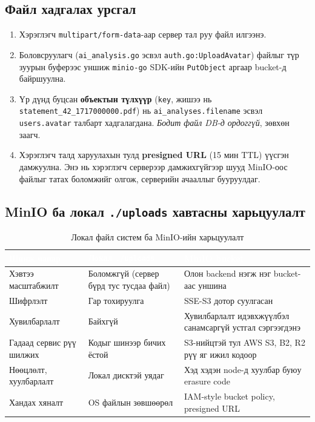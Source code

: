 \subsection{Файл хадгалах урсгал}
\begin{enumerate}
    \item Хэрэглэгч \texttt{multipart/form-data}-аар сервер тал руу файл илгээнэ.
    \item Боловсруулагч (\texttt{ai\_analysis.go} эсвэл \texttt{auth.go:UploadAvatar}) файлыг түр зуурын буферээс уншиж \texttt{minio-go} SDK-ийн \texttt{PutObject} аргаар bucket-д байршуулна.
    \item Үр дүнд буцсан \textbf{объектын түлхүүр} (\texttt{key}, жишээ нь \texttt{statement\_42\_1717000000.pdf}) нь \texttt{ai\_analyses.filename} эсвэл \texttt{users.avatar} талбарт хадгалагдана. \emph{Бодит файл DB-д ордоггүй}, зөвхөн заагч.
    \item Хэрэглэгч талд харуулахын тулд \textbf{presigned URL} (15 мин TTL) үүсгэн дамжуулна. Энэ нь хэрэглэгч серверээр дамжихгүйгээр шууд MinIO-оос файлыг татах боломжийг олгож, серверийн ачааллыг бууруулдаг.
\end{enumerate}

\subsection{MinIO ба локал \texttt{./uploads} хавтасны харьцуулалт}
\begin{table}[ht]
\centering
\footnotesize
\renewcommand{\arraystretch}{1.3}
\begin{tabular}{|p{3.5cm}|p{4.2cm}|p{4.5cm}|}
\hline
\rowcolor{darknavy}
\textcolor{white}{\textbf{Шинж чанар}} & \textcolor{white}{\textbf{Локал \texttt{./uploads}}} & \textcolor{white}{\textbf{MinIO bucket}} \\ \hline
Хэвтээ масштабжилт & Боломжгүй (сервер бүрд тус тусдаа файл) & Олон backend нэгж нэг bucket-аас уншина \\ \hline
Шифрлэлт            & Гар тохируулга                          & SSE-S3 дотор суулгасан \\ \hline
Хувилбарлалт         & Байхгүй                                 & Хувилбарлалт идэвхжүүлбэл санамсаргүй устгал сэргээгдэнэ \\ \hline
Гадаад сервис рүү шилжих & Кодыг шинээр бичих ёстой               & S3-нийцтэй тул AWS S3, B2, R2 рүү яг ижил кодоор \\ \hline
Нөөцлөлт, хуулбарлалт & Локал дисктэй уядаг                    & Хэд хэдэн node-д хуулбар буюу erasure code \\ \hline
Хандах хяналт         & OS файлын зөвшөөрөл                     & IAM-style bucket policy, presigned URL \\ \hline
\end{tabular}
\caption{Локал файл систем ба MinIO-ийн харьцуулалт}
\label{tab:fs-vs-minio}
\end{table}

